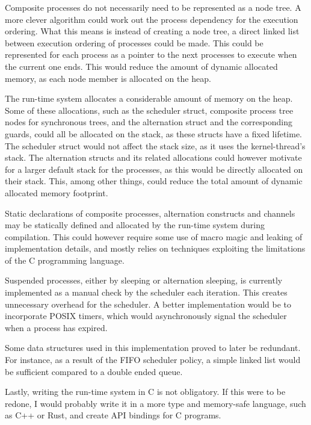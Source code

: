 Composite processes do not necessarily need to be represented as a node tree. A more clever algorithm could work out the process dependency for the execution ordering. What this means is instead of creating a node tree, a direct linked list between execution ordering of processes could be made. This could be represented for each process as a pointer to the next processes to execute when the current one ends. This would reduce the amount of dynamic allocated memory, as each node member is allocated on the heap. 

The run\hyp{}time system allocates a considerable amount of memory on the heap. Some of these allocations, such as the scheduler struct, composite process tree nodes for synchronous trees, and the alternation struct and the corresponding guards, could all be allocated on the stack, as these structs have a fixed lifetime. The scheduler struct would not affect the stack size, as it uses the kernel\hyp{}thread's stack. The alternation structs and its related allocations could however motivate for a larger default stack for the processes, as this would be directly allocated on their stack. This, among other things, could reduce the total amount of dynamic allocated memory footprint.

Static declarations of composite processes, alternation constructs and channels may be statically defined and allocated by the run\hyp{}time system during compilation. This could however require some use of macro magic and leaking of implementation details, and mostly relies on techniques exploiting the limitations of the C programming language.

Suspended processes, either by sleeping or alternation sleeping, is currently implemented as a manual check by the scheduler each iteration. This creates unnecessary overhead for the scheduler. A better implementation would be to incorporate POSIX timers, which would asynchronously signal the scheduler when a process has expired.

Some data structures used in this implementation proved to later be redundant. For instance, as a result of the FIFO scheduler policy, a simple linked list would be sufficient compared to a double ended queue. 

Lastly, writing the run\hyp{}time system in C is not obligatory. If this were to be redone, I would probably write it in a more type and memory\hyp{}safe language, such as C++ or Rust, and create API bindings for C programs. 

